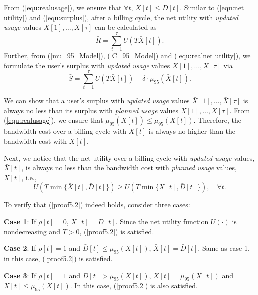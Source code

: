 \documentclass[10pt,journal,compsoc]{IEEEtran}
\begin{document}
From (\ref{equ:realusage}), we ensure that $\forall t$, $\bar{X}[t]\leq \bar{D}[t]$. Similar to (\ref{equ:net utility}) and (\ref{equ:surplus}), after a billing cycle, the  net utility with \emph{updated usage} values $\bar{X}[1],\ldots,\bar{X}[\tau]$ can be calculated as
\begin{equation}
\label{equ:realnet utility}
\bar{R} = \sum_{t=1}^{\tau} {U(T\bar{X}[t])}.
\end{equation}
Further, from  (\ref{mu_95_Model}), (\ref{C_95_Model})  and (\ref{equ:realnet utility}), we formulate the user's  surplus  with \emph{updated usage} values $\bar{X}[1],\ldots,\bar{X}[\tau]$ via
\begin{equation}\label{equ:realsurplus}
\bar{S}=\sum_{t=1}^{\tau} {U(T\bar{X}[t])}-\delta \cdot \mu_{95}(\bar{X}[t]).
\end{equation}

We can show that a user's surplus with \emph{updated usage} values $\bar{X}[1],\ldots,\bar{X}[\tau]$ is always no less than its surplus with \emph{planned usage} values $X[1],\ldots,X[\tau]$.
From  (\ref{equ:realusage}), we ensure that
$\mu_{95}(\bar{X}[t]) \leq \mu_{95}(X[t])$.
Therefore, the bandwidth cost over a billing cycle with  $\bar{X}[t]$ is always no higher than the bandwidth cost with  $X[t]$.
\noindent

Next, we notice that the net utility over a billing cycle with \emph{updated usage} values, $\bar{X}[t]$, is always no less than the bandwidth cost with \emph{planned usage} values, $X[t]$, i.e.,
\begin{equation}\label{proof5.2}
U(T\min\{\bar{X}[t],\bar{D}[t]\}) \geq U(T\min\{X[t],\bar{D}[t]\}), \quad \forall t.
\end{equation}

\noindent To verify that (\ref{proof5.2}) indeed holds,  consider three cases:

\noindent
\textbf{Case 1}: If $\rho[t]=0$, $\bar{X}[t]=\bar{D}[t]$. Since the net utility function $U(\cdot)$ is nondecreasing and $T>0$, (\ref{proof5.2}) is satisfied.
 
\noindent
\textbf{Case 2}: If $\rho[t]=1$ and $\bar{D}[t] \leq \mu_{95}(X[t])$, $\bar{X}[t]=\bar{D}[t]$. Same as case 1, in this case,  (\ref{proof5.2}) is  satisfied.

\noindent
\textbf{Case 3}: If $\rho[t]=1$ and $\bar{D}[t] > \mu_{95}(X[t])$, $\bar{X}[t]=\mu_{95}(X[t])$ and $X[t] \leq \mu_{95}(X[t])$. In this case, (\ref{proof5.2}) is also satisfied.

\noindent
\end{document}
